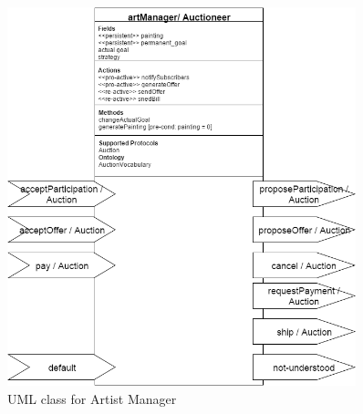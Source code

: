 \documentclass[a4paper,11pt]{report}
\begin{document}
   \begin{figure}[ht!]
    \centering
    \includegraphics[width=0.9\textwidth]{media/artistManager_class.png}
    \caption{UML class for Artist Manager}
    \label{figure:classArtistManager}
   \end{figure}
   
\end{document}
